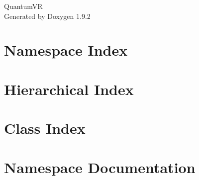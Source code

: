 \documentclass[twoside]{book}
\newcommand{\+}{\discretionary{\mbox{\scriptsize$\hookleftarrow$}}{}{}}
\newcommand{\clearemptydoublepage}{%
    \newpage{\pagestyle{empty}\cleardoublepage}%
  }
\begin{document}
  \raggedbottom
    \hypersetup{pageanchor=false,
                bookmarksnumbered=true,
                pdfencoding=unicode
               }
  \begin{titlepage}
  \vspace*{7cm}
  \begin{center}%
  {\Large Quantum\+VR}\\
  \vspace*{1cm}
  {\large Generated by Doxygen 1.9.2}\\
  \end{center}
  \end{titlepage}
  \clearemptydoublepage
  \tableofcontents
  \clearemptydoublepage
  \hypersetup{pageanchor=true}
\chapter{Namespace Index}

\chapter{Hierarchical Index}

\chapter{Class Index}

\chapter{Namespace Documentation}







\end{document}
